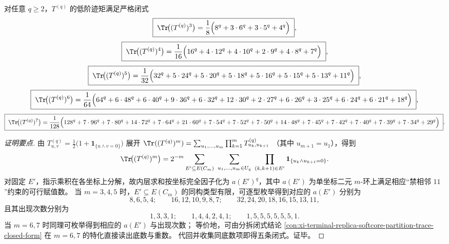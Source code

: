 \begin{conclusion}\label{con:xi-terminal-replica-softcore-low-moment-trace-exponential-decomposition}
对任意 \(q\ge 2\)，\(T^{(q)}\) 的低阶迹矩满足严格闭式
\[
\boxed{\;
\Tr\!\bigl((T^{(q)})^3\bigr)=\frac18\Big(8^{q}+3\cdot 6^{q}+3\cdot 5^{q}+4^{q}\Big)\; } ,
\]
\[
\boxed{\;
\Tr\!\bigl((T^{(q)})^4\bigr)=\frac1{16}\Big(16^{q}+4\cdot 12^{q}+4\cdot 10^{q}+2\cdot 9^{q}+4\cdot 8^{q}+7^{q}\Big)\; } ,
\]
\[
\boxed{\;
\Tr\!\bigl((T^{(q)})^5\bigr)=\frac1{32}\Big(32^{q}+5\cdot 24^{q}+5\cdot 20^{q}+5\cdot 18^{q}+5\cdot 16^{q}+5\cdot 15^{q}+5\cdot 13^{q}+11^{q}\Big)\; } ,
\]
\[
\boxed{\;
\Tr\!\bigl((T^{(q)})^6\bigr)=\frac1{64}\Big(
64^{q}+6\cdot48^{q}+6\cdot40^{q}+9\cdot36^{q}+6\cdot32^{q}+12\cdot30^{q}
+2\cdot27^{q}+6\cdot26^{q}+3\cdot25^{q}+6\cdot24^{q}+6\cdot21^{q}+18^{q}\Big)\; } ,
\]
\[
\boxed{\;
\Tr\!\bigl((T^{(q)})^7\bigr)=\frac1{128}\Big(
128^{q}+7\cdot96^{q}+7\cdot80^{q}+14\cdot72^{q}+7\cdot64^{q}+21\cdot60^{q}
+7\cdot54^{q}+7\cdot52^{q}+7\cdot50^{q}+14\cdot48^{q}+7\cdot45^{q}
+7\cdot42^{q}+7\cdot40^{q}+7\cdot39^{q}+7\cdot34^{q}+29^{q}\Big)\; } .
\]
\end{conclusion}
\begin{proof}[证明要点]
由 \(T^{(q)}_{u,v}=\frac12\bigl(1+\mathbf{1}_{\{u\wedge v=0\}}\bigr)\) 展开
\(
\Tr((T^{(q)})^m)=\sum_{u_1,\dots,u_m}\prod_{k=1}^{m}T^{(q)}_{u_k,u_{k+1}}
\)
（其中 \(u_{m+1}=u_1\)），得到
\[
\Tr\!\bigl((T^{(q)})^m\bigr)
=2^{-m}\sum_{E'\subseteq E(C_m)}\ \sum_{u_1,\dots,u_m\in U_q}\ \prod_{(k,k+1)\in E'}\mathbf{1}_{\{u_k\wedge u_{k+1}=0\}}.
\]
对固定 \(E'\)，指示乘积在各坐标上分解，故内层求和按坐标完全因子化为 \(a(E')^q\)，其中 \(a(E')\) 为单坐标二元 \(m\)-环上满足相应“禁相邻 \(11\)”约束的可行赋值数。
当 \(m=3,4,5\) 时，\(E'\subseteq E(C_m)\) 的同构类型有限，可逐型枚举得到对应的 \(a(E')\) 分别为
\[
8,6,5,4;\qquad
16,12,10,9,8,7;\qquad
32,24,20,18,16,15,13,11,
\]
且其出现次数分别为
\[
1,3,3,1;\qquad
1,4,4,2,4,1;\qquad
1,5,5,5,5,5,5,1.
\]
当 \(m=6,7\) 时同理可枚举得到相应的 \(a(E')\) 与出现次数；
等价地，可由分拆闭式结论 \ref{con:xi-terminal-replica-softcore-partition-trace-closed-form} 在 \(m=6,7\) 的特化直接读出底数与重数。
代回并收集同底数项即得五条闭式。证毕。
\end{proof}


